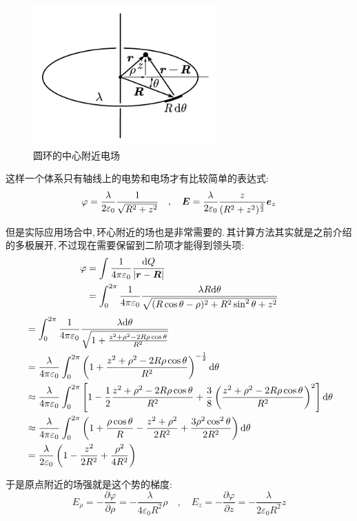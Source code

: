 \begin{figure}
\centering
\includegraphics[width=7cm]{image/7-1-20.png}
\caption{圆环的中心附近电场}
\end{figure}
这样一个体系只有轴线上的电势和电场才有比较简单的表达式:
\[\varphi=\frac{\lambda}{2\varepsilon_0}\frac{1}{\sqrt{R^2+z^2}} \quad, \quad \boldsymbol{E}=\frac{\lambda}{2\varepsilon_0}\frac{z}{(R^2+z^2)^{\frac{3}{2}}}\boldsymbol{e}_z\]

但是实际应用场合中,\,环心附近的场也是非常需要的.\,其计算方法其实就是之前介绍的多极展开,\,不过现在需要保留到二阶项才能得到领头项:
\begin{align*}
\varphi  	&= \int \frac{1}{4\pi\varepsilon_0} \frac{\textrm{d} Q}{|\boldsymbol{r}-\boldsymbol{R}|}\\
				&= \int_0^{2\pi} \frac{1}{4\pi\varepsilon_0} \frac{\lambda R\textrm{d} \theta}{\sqrt{(R\cos\theta -\rho)^2+ R^2\sin^2 \theta +z^2}}\\
				\end{align*}
				\begin{align*}
				&= \int_0^{2\pi} \frac{1}{4\pi\varepsilon_0} \frac{\lambda \textrm{d} \theta}{\sqrt{1+\frac{z^2+\rho^2-2R\rho\cos\theta}{R^2}}}\\
				&= \frac{\lambda}{4\pi\varepsilon_0}\int_0^{2\pi} \left(1+\frac{z^2+\rho^2-2R\rho\cos\theta}{R^2}\right)^{-\frac{1}{2}}\textrm{d} \theta\\
				&\approx \frac{\lambda}{4\pi\varepsilon_0}\int_0^{2\pi} \left[1-\frac{1}{2}\frac{z^2+\rho^2-2R\rho\cos\theta}{R^2}+\frac{3}{8}\left( \frac{z^2+\rho^2-2R\rho\cos\theta}{R^2} \right)^2 \right]\textrm{d} \theta\\
				&\approx \frac{\lambda}{4\pi\varepsilon_0}\int_0^{2\pi} \left(1+\frac{\rho\cos\theta}{R}-\frac{z^2+\rho^2}{2R^2}+\frac{3\rho^2\cos^2\theta}{2R^2} \right)\textrm{d} \theta\\
				&= \frac{\lambda}{2\varepsilon_0}\left(1-\frac{z^2}{2R^2}+\frac{\rho^2}{4R^2} \right)\\
\end{align*}

于是原点附近的场强就是这个势的梯度:
\[E_\rho=-\frac{\partial \varphi}{\partial \rho}=-\frac{\lambda}{4\varepsilon_0 R^2}\rho \quad,\quad E_z=-\frac{\partial \varphi}{\partial z}=-\frac{\lambda}{2\varepsilon_0 R^2}z\]

